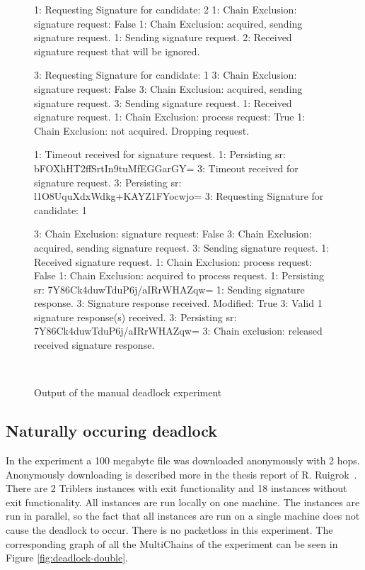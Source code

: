 \begin{figure}
\begin{FVerbatim}[fontsize=\small]
1: Requesting Signature for candidate: 2
1: Chain Exclusion: signature request: False
1: Chain Exclusion: acquired, sending signature request.
1: Sending signature request.
2: Received signature request that will be ignored.

3: Requesting Signature for candidate: 1
3: Chain Exclusion: signature request: False
3: Chain Exclusion: acquired, sending signature request.
3: Sending signature request.
1: Received signature request.
1: Chain Exclusion: process request: True
1: Chain Exclusion: not acquired. Dropping request.

1: Timeout received for signature request.
1: Persisting sr: bFOXhHT2ffSrtIn9tuMfEGGarGY=
3: Timeout received for signature request.
3: Persisting sr: l1O8UquXdxWdkg+KAYZ1FYocwjo=
3: Requesting Signature for candidate: 1

3: Chain Exclusion: signature request: False
3: Chain Exclusion: acquired, sending signature request.
3: Sending signature request.
1: Received signature request.
1: Chain Exclusion: process request: False
1: Chain Exclusion: acquired to process request.
1: Persisting sr: 7Y86Ck4duwTduP6j/aIRrWHAZqw=
1: Sending signature response.
3: Signature response received. Modified: True
3: Valid 1 signature response(s) received.
3: Persisting sr: 7Y86Ck4duwTduP6j/aIRrWHAZqw=
3: Chain exclusion: released received signature response.
\end{FVerbatim}
    \caption{Output of the manual deadlock experiment}~\label{fig:manual-deadlock-experiment}
\end{figure}

\subsection{Naturally occuring deadlock}
In the experiment a 100 megabyte file was downloaded anonymously with 2 hops.
Anonymously downloading is described more in the thesis report of R. Ruigrok~\cite{ruigrok-anonymous}.
There are 2 Triblers instances with exit functionality and 18 instances without exit functionality.
All instances are run locally on one machine.
The instances are run in parallel,
so the fact that all instances are run on a single machine does not cause the deadlock to occur.
There is no packetloss in this experiment.
The corresponding graph of all the MultiChains of the experiment can be seen in Figure \ref{fig:deadlock-double}.

